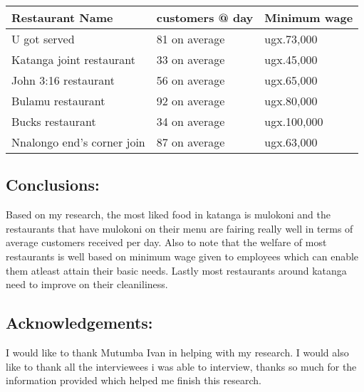 \documentclass{article}
\begin{document}
\begin{tabu} to 1.0\textwidth{ | X[1] | X[c] | X[r] | }
\hline
Restaurant Name & customers @ day & Minimum wage \\
\hline
U got served&81 on average&ugx.73,000\\
\hline
Katanga joint restaurant&33 on average&ugx.45,000\\
\hline
John 3:16 restaurant&56 on average&ugx.65,000\\
\hline
Bulamu restaurant&92 on average&ugx.80,000\\
\hline
Bucks restaurant& 34 on average&ugx.100,000\\
\hline
Nnalongo end's corner join&87 on average&ugx.63,000\\
\hline
\end{tabu}
\begin{center}
\section{ Conclusions:}
 \vspace{5mm}
 Based on my research, the most liked food in katanga is mulokoni and the restaurants that have mulokoni on their menu are fairing really well in terms of average customers received per day.
Also to note that the welfare of most restaurants is well based on minimum wage given to employees which can enable them atleast attain their basic needs.
Lastly most restaurants around katanga need to improve on their cleaniliness.
\end{center}
\begin{center}
\section{ Acknowledgements:}
\vspace{5mm}
I would like to thank Mutumba Ivan in helping with my research.
I would also like to thank all the interviewees i was able to interview, thanks so much for the information provided which helped me finish this research.
\end{center}
\end{document}
